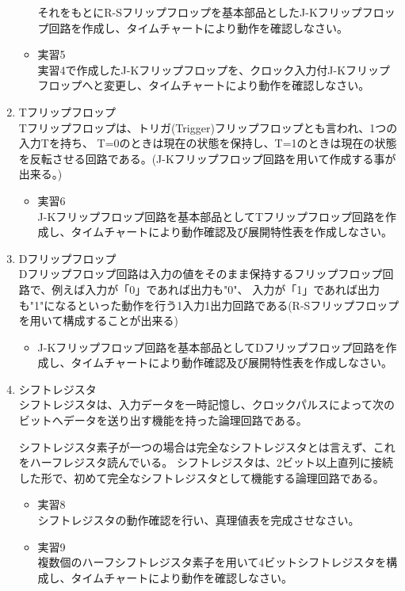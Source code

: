 \documentclass[dvipdfmx]{jsarticle}
\begin{document}
\begin{enumerate}
\begin{itemize}
						それをもとにR-Sフリップフロップを基本部品としたJ-Kフリップフロップ回路を作成し、タイムチャートにより動作を確認しなさい。
					\item 実習5 \\
						実習4で作成したJ-Kフリップフロップを、クロック入力付J-Kフリップフロップへと変更し、タイムチャートにより動作を確認しなさい。
				\end{itemize}
			\item Tフリップフロップ \\
				Tフリップフロップは、トリガ(Trigger)フリップフロップとも言われ、1つの入力Tを持ち、
				T=0のときは現在の状態を保持し、T=1のときは現在の状態を反転させる回路である。(J-Kフリップフロップ回路を用いて作成する事が出来る。)
				\begin{itemize}
					\item 実習6 \\
						J-Kフリップフロップ回路を基本部品としてTフリップフロップ回路を作成し、タイムチャートにより動作確認及び展開特性表を作成しなさい。
				\end{itemize}
			\item Dフリップフロップ \\
				Dフリップフロップ回路は入力の値をそのまま保持するフリップフロップ回路で、例えば入力が「0」であれば出力も"0"、
				入力が「1」であれば出力も"1"になるといった動作を行う1入力1出力回路である(R-Sフリップフロップを用いて構成することが出来る)
				\begin{itemize}
					\item J-Kフリップフロップ回路を基本部品としてDフリップフロップ回路を作成し、タイムチャートにより動作確認及び展開特性表を作成しなさい。
				\end{itemize}
			\item シフトレジスタ \\
				シフトレジスタは、入力データを一時記憶し、クロックパルスによって次のビットへデータを送り出す機能を持った論理回路である。\par
				シフトレジスタ素子が一つの場合は完全なシフトレジスタとは言えず、これをハーフレジスタ読んでいる。
				シフトレジスタは、2ビット以上直列に接続した形で、初めて完全なシフトレジスタとして機能する論理回路である。
				\begin{itemize}
					\item 実習8 \\
						シフトレジスタの動作確認を行い、真理値表を完成させなさい。
					\item 実習9 \\
						複数個のハーフシフトレジスタ素子を用いて4ビットシフトレジスタを構成し、タイムチャートにより動作を確認しなさい。
				\end{itemize}
		\end{enumerate}
\end{document}
